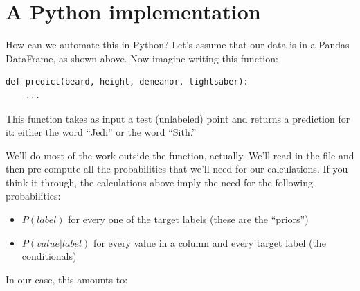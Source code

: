 \section{A Python implementation}

How can we automate this in Python? Let's assume that our data is in a Pandas
DataFrame, as shown above. Now imagine writing this function:

\begin{Verbatim}[fontsize=\small,samepage=true,frame=single]
def predict(beard, height, demeanor, lightsaber):
    ...
\end{Verbatim}

This function takes as input a test (unlabeled) point and returns a prediction
for it: either the word ``Jedi'' or the word ``Sith.''


We'll do most of the work outside the function, actually. We'll read in the
file and then pre-compute all the probabilities that we'll need for our
calculations. If you think it through, the calculations above imply the need
for the following probabilities:

\pagebreak
\begin{itemize}
\itemsep.1em
\item $P(label)$ for every one of the target labels (these are the ``priors'')
\item $P(value|label)$ for every value in a column and every target label (the
conditionals)
\end{itemize}

In our case, this amounts to:

